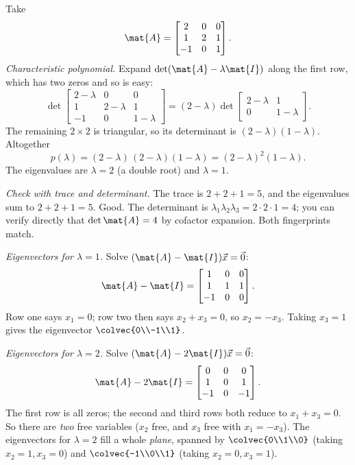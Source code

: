 \begin{example}
\label{ch23:ex-3x3}
Take
\[
  \mat{A}=\begin{bmatrix}2 & 0 & 0\\ 1 & 2 & 1\\ -1 & 0 & 1\end{bmatrix}.
\]
\emph{Characteristic polynomial.} Expand $\det(\mat{A}-\lambda\mat{I})$ along the
first row, which has two zeros and so is easy:
\[
  \det\begin{bmatrix}2-\lambda & 0 & 0\\ 1 & 2-\lambda & 1\\ -1 & 0 & 1-\lambda\end{bmatrix}
  =(2-\lambda)\det\begin{bmatrix}2-\lambda & 1\\ 0 & 1-\lambda\end{bmatrix}.
\]
The remaining $2\times 2$ is triangular, so its determinant is
$(2-\lambda)(1-\lambda)$. Altogether
\[
  p(\lambda)=(2-\lambda)\,(2-\lambda)(1-\lambda)=(2-\lambda)^2(1-\lambda).
\]
The eigenvalues are $\lambda=2$ (a double root) and $\lambda=1$.

\emph{Check with trace and determinant.} The trace is $2+2+1=5$, and the
eigenvalues sum to $2+2+1=5$. Good. The determinant is
$\lambda_1\lambda_2\lambda_3=2\cdot2\cdot1=4$; you can verify directly that
$\det\mat{A}=4$ by cofactor expansion. Both fingerprints match.

\emph{Eigenvectors for $\lambda=1$.} Solve $(\mat{A}-\mat{I})\vec{x}=\vec{0}$:
\[
  \mat{A}-\mat{I}=\begin{bmatrix}1 & 0 & 0\\ 1 & 1 & 1\\ -1 & 0 & 0\end{bmatrix}.
\]
Row one says $x_1=0$; row two then says $x_2+x_3=0$, so $x_2=-x_3$. Taking
$x_3=1$ gives the eigenvector $\colvec{0\\-1\\1}$.

\emph{Eigenvectors for $\lambda=2$.} Solve $(\mat{A}-2\mat{I})\vec{x}=\vec{0}$:
\[
  \mat{A}-2\mat{I}=\begin{bmatrix}0 & 0 & 0\\ 1 & 0 & 1\\ -1 & 0 & -1\end{bmatrix}.
\]
The first row is all zeros; the second and third rows both reduce to
$x_1+x_3=0$. So there are \emph{two} free variables ($x_2$ free, and $x_3$ free
with $x_1=-x_3$). The eigenvectors for $\lambda=2$ fill a whole \emph{plane},
spanned by $\colvec{0\\1\\0}$ (taking $x_2=1,x_3=0$) and $\colvec{-1\\0\\1}$
(taking $x_2=0,x_3=1$).


\end{example}
